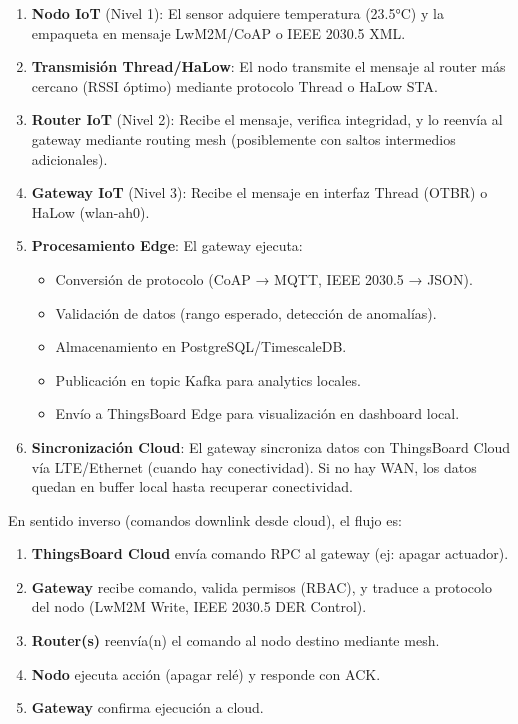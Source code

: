 \begin{enumerate}
    \item \textbf{Nodo IoT} (Nivel 1): El sensor adquiere temperatura (23.5°C) y la empaqueta en mensaje LwM2M/CoAP o IEEE 2030.5 XML.
    \item \textbf{Transmisión Thread/HaLow}: El nodo transmite el mensaje al router más cercano (RSSI óptimo) mediante protocolo Thread o HaLow STA.
    \item \textbf{Router IoT} (Nivel 2): Recibe el mensaje, verifica integridad, y lo reenvía al gateway mediante routing mesh (posiblemente con saltos intermedios adicionales).
    \item \textbf{Gateway IoT} (Nivel 3): Recibe el mensaje en interfaz Thread (OTBR) o HaLow (wlan-ah0).
    \item \textbf{Procesamiento Edge}: El gateway ejecuta:
    \begin{itemize}
        \item Conversión de protocolo (CoAP → MQTT, IEEE 2030.5 → JSON).
        \item Validación de datos (rango esperado, detección de anomalías).
        \item Almacenamiento en PostgreSQL/TimescaleDB.
        \item Publicación en topic Kafka para analytics locales.
        \item Envío a ThingsBoard Edge para visualización en dashboard local.
    \end{itemize}
    \item \textbf{Sincronización Cloud}: El gateway sincroniza datos con ThingsBoard Cloud vía LTE/Ethernet (cuando hay conectividad). Si no hay WAN, los datos quedan en buffer local hasta recuperar conectividad.
\end{enumerate}

En sentido inverso (comandos downlink desde cloud), el flujo es:

\begin{enumerate}
    \item \textbf{ThingsBoard Cloud} envía comando RPC al gateway (ej: apagar actuador).
    \item \textbf{Gateway} recibe comando, valida permisos (RBAC), y traduce a protocolo del nodo (LwM2M Write, IEEE 2030.5 DER Control).
    \item \textbf{Router(s)} reenvía(n) el comando al nodo destino mediante mesh.
    \item \textbf{Nodo} ejecuta acción (apagar relé) y responde con ACK.
    \item \textbf{Gateway} confirma ejecución a cloud.
\end{enumerate}

